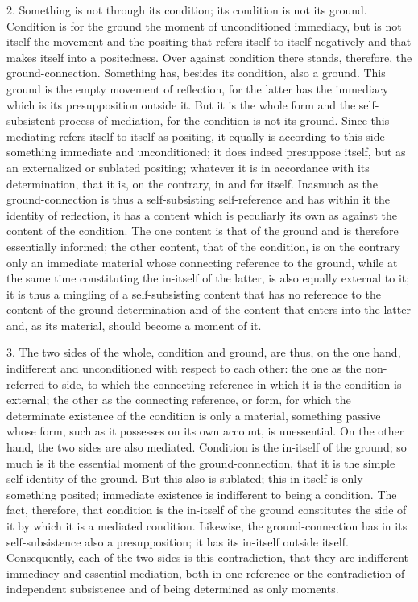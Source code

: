 2. Something is not through its condition;
its condition is not its ground.
Condition is for the ground the moment of unconditioned immediacy,
but is not itself the movement
and the positing that refers itself to itself negatively
and that makes itself into a positedness.
Over against condition there stands, therefore, the ground-connection.
Something has, besides its condition, also a ground.
This ground is the empty movement of reflection,
for the latter has the immediacy
which is its presupposition outside it.
But it is the whole form
and the self-subsistent process of mediation,
for the condition is not its ground.
Since this mediating refers itself to itself as positing,
it equally is according to this side
something immediate and unconditioned;
it does indeed presuppose itself,
but as an externalized or sublated positing;
whatever it is in accordance with its determination,
that it is, on the contrary, in and for itself.
Inasmuch as the ground-connection is thus
a self-subsisting self-reference and has within it the
identity of reflection,
it has a content which is peculiarly its own as against
the content of the condition.
The one content is that of the ground and is
therefore essentially informed;
the other content, that of the condition,
is on the contrary only an immediate material
whose connecting reference to the ground,
while at the same time constituting the in-itself of the latter,
is also equally external to it;
it is thus a mingling of a self-subsisting content
that has no reference to the content of the ground determination
and of the content that enters into the latter
and, as its material, should become a moment of it.

3. The two sides of the whole, condition and ground, are thus,
on the one hand, indifferent
and unconditioned with respect to each other:
the one as the non-referred-to side,
to which the connecting reference
in which it is the condition is external;
the other as the connecting reference, or form,
for which the determinate existence of
the condition is only a material,
something passive whose form,
such as it possesses on its own account,
is unessential.
On the other hand, the two sides are also mediated.
Condition is the in-itself of the ground;
so much is it the essential moment of the
ground-connection, that it is the simple self-identity of the ground.
But this also is sublated;
this in-itself is only something posited;
immediate existence is indifferent to being a condition.
The fact, therefore, that condition is the in-itself
of the ground constitutes the side of it
by which it is a mediated condition.
Likewise, the ground-connection has
in its self-subsistence also a presupposition;
it has its in-itself outside itself.
Consequently, each of the two sides is this contradiction,
that they are indifferent immediacy and essential mediation,
both in one reference
or the contradiction of independent subsistence
and of being determined as only moments.


